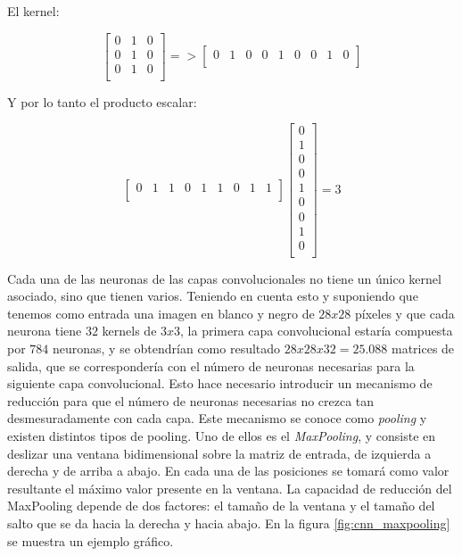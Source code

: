 El kernel:

\begin{equation}
	\left[
	\begin{array}{ccc}
		0 & 1 & 0 \\
		0 & 1 & 0 \\
		0 & 1 & 0 \\
	\end{array}
	\right]
	=>
	\left[
	\begin{array}{ccccccccc}
		0 & 1 & 0 & 0 & 1 & 0 & 0 & 1 & 0 \\
	\end{array}
	\right]
	\nonumber
\end{equation}

Y por lo tanto el producto escalar:

\begin{equation}
	\left[
	\begin{array}{ccccccccc}
		0 & 1 & 1 & 0 & 1 & 1 & 0 & 1 & 1 \\
	\end{array}
	\right]
	\left[
	\begin{array}{c}
		0 \\
		1 \\
		0 \\
		0 \\
		1 \\
		0 \\
		0 \\
		1 \\
		0 \\
	\end{array}
	\right] = 3
	\nonumber
\end{equation}

Cada una de las neuronas de las capas convolucionales no tiene un único kernel asociado, sino que tienen varios. Teniendo en cuenta esto y suponiendo que tenemos como entrada una imagen en blanco y negro de $28x28$ píxeles y que cada neurona tiene $32$ kernels de $3x3$, la primera capa convolucional estaría compuesta por $784$ neuronas, y se obtendrían como resultado $28 x 28 x 32 = 25.088$ matrices de salida, que se correspondería con el número de neuronas necesarias para la siguiente capa convolucional. Esto hace necesario introducir un mecanismo de reducción para que el número de neuronas necesarias no crezca tan desmesuradamente con cada capa. Este mecanismo se conoce como \textit{pooling} y existen distintos tipos de pooling. Uno de ellos es el \textit{MaxPooling}, y consiste en deslizar una ventana bidimensional sobre la matriz de entrada, de izquierda a derecha y de arriba a abajo. En cada una de las posiciones se tomará como valor resultante el máximo valor presente en la ventana. La capacidad de reducción del MaxPooling depende de dos factores: el tamaño de la ventana y el tamaño del salto que se da hacia la derecha y hacia abajo. En la figura \ref{fig:cnn_maxpooling} se muestra un ejemplo gráfico.

